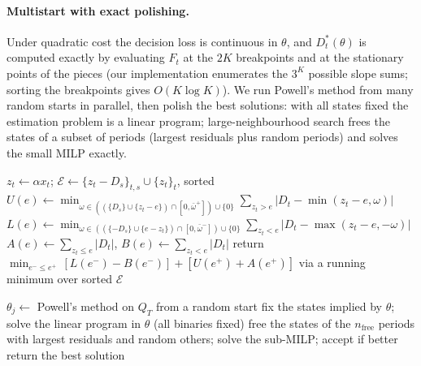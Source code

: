 \documentclass[11pt,a4paper]{article}
\theoremstyle{remark}\newtheorem{remark}{Remark}
\begin{document}
\paragraph{Multistart with exact polishing.} Under quadratic cost the decision loss is continuous in $\theta$, and $D^*_t(\theta)$ is computed exactly by evaluating $F_t$ at the $2K$ breakpoints and at the stationary points of the pieces (our implementation enumerates the $3^K$ possible slope sums; sorting the breakpoints gives $O(K\log K)$). We run Powell's method from many random starts in parallel, then polish the best solutions: with all states fixed the estimation problem is a linear program; large-neighbourhood search frees the states of a subset of periods (largest residuals plus random periods) and solves the small MILP exactly.

\begin{algorithm}[t]\caption{Exact one-goal estimator for fixed $\alpha$ (Theorem~\ref{thm:exact})}\label{alg:exact}
\begin{algorithmic}[1]
\State $z_t\gets\alpha x_t$; $\mathcal{E}\gets\{z_t-D_s\}_{t,s}\cup\{z_t\}_t$, sorted
  \State $U(e)\gets\min_{\omega\in((\{D_s\}\cup\{z_t-e\})\cap[0,\bar\omega^+])\cup\{0\}}\sum_{z_t>e}|D_t-\min(z_t-e,\omega)|$ 
  \State $L(e)\gets\min_{\omega\in((\{-D_s\}\cup\{e-z_t\})\cap[0,\bar\omega^-])\cup\{0\}}\sum_{z_t<e}|D_t-\max(z_t-e,-\omega)|$ 
  \State $A(e)\gets\sum_{z_t\le e}|D_t|$, $B(e)\gets\sum_{z_t<e}|D_t|$ 
\EndFor
\State return $\min_{e^-\le e^+}\,[L(e^-)-B(e^-)]+[U(e^+)+A(e^+)]$ via a running minimum over sorted $\mathcal{E}$
\end{algorithmic}\end{algorithm}
\begin{algorithm}[t]\caption{Multistart heuristic with exact polishing (several goals)}\label{alg:ms}
\begin{algorithmic}[1]
 \State $\theta_j\gets$ Powell's method on $Q_T$ from a random start \EndFor
{}
  \State fix the states implied by $\theta$; solve the linear program in $\theta$ (all binaries fixed)
   \State free the states of the $n_{\mathrm{free}}$ periods with largest residuals and random others; solve the sub-MILP; accept if better \EndFor
\EndFor
\State return the best solution
\end{algorithmic}\end{algorithm}
\end{document}
